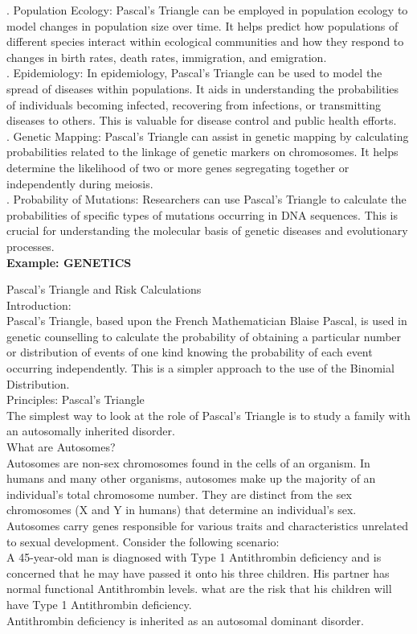 . Population Ecology: Pascal's Triangle can be employed in population ecology to model changes in population size over time. It helps predict how populations of different species interact within ecological communities and how they respond to changes in birth rates, death rates, immigration, and emigration. \\

. Epidemiology: In epidemiology, Pascal's Triangle can be used to model the spread of diseases within populations. It aids in understanding the probabilities of individuals becoming infected, recovering from infections, or transmitting diseases to others. This is valuable for disease control and public health efforts. \\

. Genetic Mapping: Pascal's Triangle can assist in genetic mapping by           calculating probabilities related to the linkage of genetic markers on chromosomes. It helps determine the likelihood of two or more genes segregating together or independently during meiosis. \\

. Probability of Mutations: Researchers can use Pascal's Triangle to calculate the probabilities of specific types of mutations occurring in DNA sequences. This is crucial for understanding the molecular basis of genetic diseases and evolutionary processes. \\

\textbf{Example: GENETICS}

Pascal's Triangle and Risk Calculations \\
Introduction: \\
Pascal's Triangle, based upon the French Mathematician Blaise Pascal, is used in genetic counselling to calculate the probability of obtaining a particular number or distribution of events of one kind knowing the probability of each event occurring independently. This is a simpler approach to the use of the Binomial Distribution. \\

Principles: Pascal's Triangle \\
The simplest way to look at the role of Pascal's Triangle is to study a family with an autosomally inherited disorder. \\
What are Autosomes? \\
Autosomes are non-sex chromosomes found in the cells of an organism. In humans and many other organisms, autosomes make up the majority of an individual's total chromosome number. They are distinct from the sex chromosomes (X and Y in humans) that determine an individual's sex. Autosomes carry genes responsible for various traits and characteristics unrelated to sexual development.
Consider the following scenario: \\
A 45-year-old man is diagnosed with Type 1 Antithrombin deficiency and is concerned that he may have passed it onto his three children. His partner has normal functional Antithrombin levels. what are the risk that his children will have Type 1 Antithrombin deficiency. \\
Antithrombin deficiency is inherited as an autosomal dominant disorder. \\

